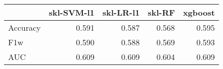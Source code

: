\begin{tabular}{lrrrr}
\toprule
{} &  skl-SVM-l1 &  skl-LR-l1 &  skl-RF &  xgboost \\
\midrule
Accuracy &       0.591 &      0.587 &   0.568 &    0.595 \\
F1w      &       0.590 &      0.588 &   0.569 &    0.593 \\
AUC      &       0.609 &      0.609 &   0.604 &    0.609 \\
\bottomrule
\end{tabular}
